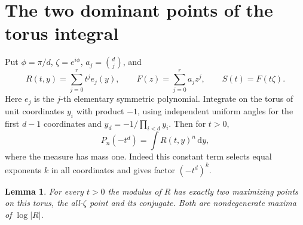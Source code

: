 \documentclass[11pt]{article}
\newtheorem{lemma}{Lemma}
\newcommand{\dd}{\mathrm d}
\begin{document}
\section{The two dominant points of the torus integral}

Put \(\phi=\pi/d\), \(\zeta=e^{i\phi}\), \(a_j=\binom dj\), and
\[
R(t,y)=\sum_{j=0}^r t^j e_j(y),\qquad
F(z)=\sum_{j=0}^r a_j z^j,\qquad S(t)=F(t\zeta).
\]
Here \(e_j\) is the \(j\)-th elementary symmetric polynomial.
Integrate on the torus of unit coordinates \(y_i\) with product
\(-1\), using independent uniform angles for the first \(d-1\)
coordinates and \(y_d=-1/\prod_{i<d}y_i\).
Then for \(t>0\),
\begin{equation}\label{eq:torus}
P_n(-t^d)=\int R(t,y)^n\,\dd y,
\end{equation}
where the measure has mass one. Indeed this constant term
selects equal exponents \(k\) in all coordinates and gives
factor \((-t^d)^k\).

\begin{lemma}\label{lem:dominance}
For every \(t>0\) the modulus of \(R\) has exactly two
maximizing points on this torus, the all-\(\zeta\) point and
its conjugate. Both are nondegenerate maxima of \(\log|R|\).
\end{lemma}
\end{document}
